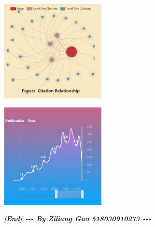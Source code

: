 \documentclass[10pt,twoside,a4paper,titlepage]{article}
\begin{document}
		\includegraphics[width=0.4\textwidth]{gjl/22.jpg}\newline\par
		\includegraphics[width=0.4\textwidth]{gjl/3.jpg}\newline\par

		\textbf{\emph{[End] -{}-{}- By Ziliang Guo 518030910273 -{}-{}-}}

		


\newpage


\end{document}
